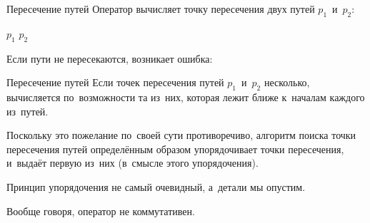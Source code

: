 
\begin{frame}{Пересечение путей}
Оператор  вычисляет точку пересечения двух путей
$p_1$~и~$p_2$:
\begin{center}
\Large
$p_1$  $p_2$
\end{center}

Если пути не пересекаются, возникает ошибка:
\begin{screen}
%
%
\end{screen}
\end{frame}


\begin{frame}{Пересечение путей}
Если точек пересечения путей $p_1$~и~$p_2$ несколько, вычисляется
по~возможности та из~них, которая лежит ближе к~началам каждого из~путей.

Поскольку это пожелание по~своей сути противоречиво, алгоритм поиска точки
пересечения путей определённым образом упорядочивает точки пересечения,
и~выдаёт первую из~них (в~смысле этого упорядочения).

Принцип упорядочения не самый очевидный, а~детали мы опустим.

Вообще говоря, оператор  не коммутативен.
\end{frame}
